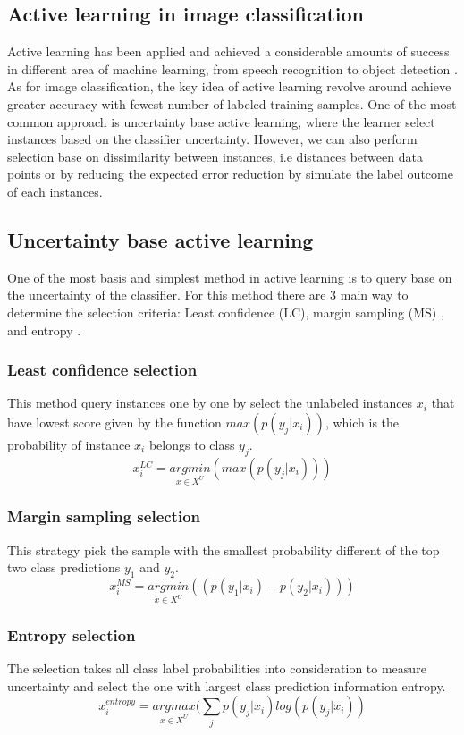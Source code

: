 \subsection{Active learning in image classification}
Active learning has been applied and achieved a considerable amounts of success in different area of machine learning, from speech recognition to object detection \cite{workshop}. As for image classification, the key idea of active learning revolve around achieve greater accuracy with fewest number of labeled training samples. One of the most common approach is uncertainty base active learning, where the learner select instances based on the classifier uncertainty. However, we can also perform selection base on dissimilarity between instances, i.e distances between data points or by reducing the expected error reduction by simulate the label outcome of each instances. 


\subsection{Uncertainty base active learning}
One of the most basis and simplest method in active learning is to query base on the uncertainty of the classifier. For this method there are 3 main way to determine the selection criteria: Least confidence (LC), margin sampling (MS) \cite{roy2001toward}, and entropy \cite{shannon1948mathematical}. 
\subsubsection{Least confidence selection}
This method query instances one by one by select the unlabeled instances $x_i$ that have lowest score given by the function $max(p(y_j|x_i))$, which is the probability of instance $x_i$ belongs to class $y_j$.
\begin{equation}
    x^{LC}_i =\underset{x \in X^U}{argmin} ( max(p(y_j|x_i)))
\end{equation}
\subsubsection{Margin sampling selection}
This strategy pick the sample with the smallest probability different of the top two class predictions $y_1$ and $y_2$.
\begin{equation}
    x^{MS}_i =\underset{x \in X^U}{argmin} ( (p(y_1|x_i)- p(y_2|x_i)))
\end{equation} 
\subsubsection{Entropy selection}
The selection takes all class label probabilities into consideration to measure uncertainty and select the one with largest class prediction information entropy.
\begin{equation}
    x^{entropy}_i =\underset{x \in X^U}{argmax} (\sum_{j}p(y_j|x_i)log(p(y_j|x_i))
\end{equation} 

